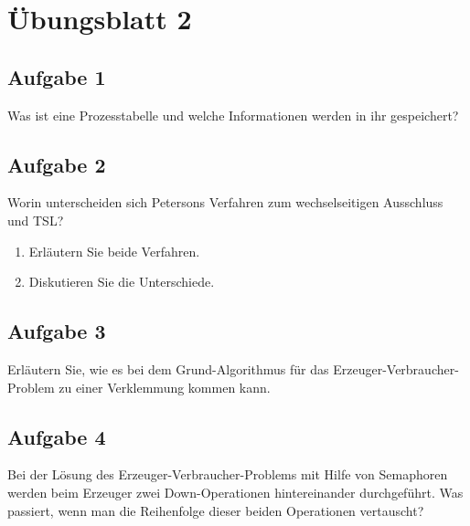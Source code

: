 \chapter{Übungsblatt 2}

\section{Aufgabe 1}

Was ist eine Prozesstabelle und welche Informationen werden in ihr gespeichert?

\section{Aufgabe 2}

Worin unterscheiden sich Petersons Verfahren zum wechselseitigen Ausschluss und
TSL?

\begin{enumerate}
    \item Erläutern Sie beide Verfahren.
    \item Diskutieren Sie die Unterschiede.
\end{enumerate}

\section{Aufgabe 3}

Erläutern Sie, wie es bei dem Grund-Algorithmus für das
Erzeuger-Verbraucher-Problem zu einer Verklemmung kommen kann.

\section{Aufgabe 4}

Bei der Lösung des Erzeuger-Verbraucher-Problems mit Hilfe von Semaphoren
werden beim Erzeuger zwei Down-Operationen hintereinander durchgeführt. Was
passiert, wenn man die Reihenfolge dieser beiden Operationen vertauscht?